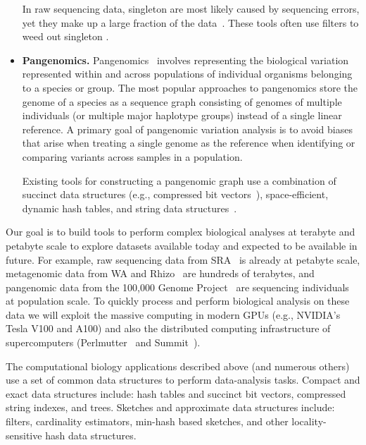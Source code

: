 \begin{itemize}[leftmargin=*]
In raw sequencing data, singleton \kmers are most likely caused by sequencing errors, yet they make up a large fraction of the data~\cite{solomon2016fast,MarccaisKi11}. These tools often use filters to weed out singleton \kmers.


\item \textbf{Pangenomics.}
Pangenomics~\cite{garrison2018variation} involves representing the biological variation represented within and across populations of individual organisms belonging to a species or group.  The most popular approaches to pangenomics store the genome of a species as a sequence graph consisting of genomes of multiple individuals (or multiple major haplotype groups) instead of a single linear reference. A primary goal of pangenomic variation analysis is to avoid biases that arise when treating a single genome as the reference when identifying or comparing variants across samples in a population.

Existing tools for constructing a pangenomic graph use a combination of succinct data structures (e.g., compressed bit vectors~\cite{garrison2018variation}), space-efficient, dynamic hash tables, and string data structures~\cite{pandey2021variantstore}.


\end{itemize}

Our goal is to build tools to perform complex biological analyses at terabyte and petabyte scale to explore datasets available today and expected to be available in future. For example, raw sequencing data from SRA~\cite{kodama2012sequence} is already at petabyte scale, metagenomic data from WA and Rhizo~\cite{hofmeyr2020terabase} are hundreds of terabytes, and pangenomic data from the 100,000 Genome Project~\cite{1002021100} are sequencing individuals at population scale. To quickly process and perform biological analysis on these data we will exploit the massive computing in modern GPUs (e.g., NVIDIA's Tesla V100 and A100) and also the distributed computing infrastructure of supercomputers (Perlmutter~\cite{perlmutter} and Summit~\cite{summit}).

The computational biology applications described above (and numerous others)  use a set of common data structures to perform data-analysis tasks.
Compact and exact data structures include: hash tables and succinct bit vectors, compressed string indexes, and trees.
Sketches and approximate data structures include: filters, cardinality estimators,  min-hash based sketches, and other locality-sensitive hash data structures.

